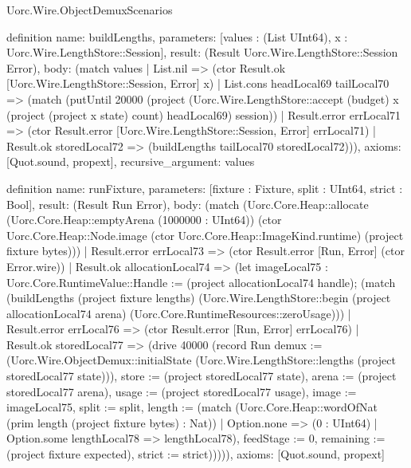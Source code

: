 \begin{lexlean}{Uorc.Wire.ObjectDemuxScenarios}
\begin{semanticmodule}
definition{
  name: buildLengths,
  parameters: [values : (List UInt64), x : Uorc.Wire.LengthStore::Session],
  result: (Result Uorc.Wire.LengthStore::Session Error),
  body: (match values
    | List.nil => (ctor Result.ok [Uorc.Wire.LengthStore::Session, Error] x)
    | List.cons headLocal69 tailLocal70 => (match (putUntil 20000 (project (Uorc.Wire.LengthStore::accept (budget) x (project (project x state) count) headLocal69) session))
      | Result.error errLocal71 => (ctor Result.error [Uorc.Wire.LengthStore::Session, Error] errLocal71)
      | Result.ok storedLocal72 => (buildLengths tailLocal70 storedLocal72))),
  axioms: [Quot.sound, propext],
  recursive_argument: values
}

definition{
  name: runFixture,
  parameters: [fixture : Fixture, split : UInt64, strict : Bool],
  result: (Result Run Error),
  body: (match (Uorc.Core.Heap::allocate (Uorc.Core.Heap::emptyArena (1000000 : UInt64)) (ctor Uorc.Core.Heap::Node.image (ctor Uorc.Core.Heap::ImageKind.runtime) (project fixture bytes)))
    | Result.error errLocal73 => (ctor Result.error [Run, Error] (ctor Error.wire))
    | Result.ok allocationLocal74 => (let imageLocal75 : Uorc.Core.RuntimeValue::Handle := (project allocationLocal74 handle); (match (buildLengths (project fixture lengths) (Uorc.Wire.LengthStore::begin (project allocationLocal74 arena) (Uorc.Core.RuntimeResources::zeroUsage)))
      | Result.error errLocal76 => (ctor Result.error [Run, Error] errLocal76)
      | Result.ok storedLocal77 => (drive 40000 (record Run {demux := (Uorc.Wire.ObjectDemux::initialState (Uorc.Wire.LengthStore::lengths (project storedLocal77 state))), store := (project storedLocal77 state), arena := (project storedLocal77 arena), usage := (project storedLocal77 usage), image := imageLocal75, split := split, length := (match (Uorc.Core.Heap::wordOfNat (prim length (project fixture bytes) : Nat))
        | Option.none => (0 : UInt64)
        | Option.some lengthLocal78 => lengthLocal78), feedStage := 0, remaining := (project fixture expected), strict := strict}))))),
  axioms: [Quot.sound, propext]
}


\end{semanticmodule}
\end{lexlean}
